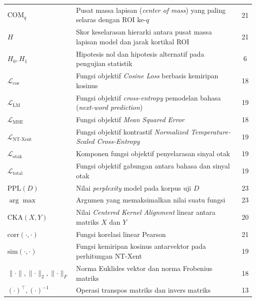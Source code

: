 \begin{longtable}{@{} l >{\raggedright\arraybackslash}p{6.5cm} c @{}}
$\mathrm{COM}_q$ & Pusat massa lapisan (\textit{center of mass}) yang paling selaras dengan ROI ke-$q$ & 21 \\
$H$ & Skor keselarasan hierarki antara pusat massa lapisan model dan jarak kortikal ROI & 21 \\
$H_0, H_1$ & Hipotesis nol dan hipotesis alternatif pada pengujian statistik & 6 \\
$\mathcal{L}_{\text{cos}}$ & Fungsi objektif \textit{Cosine Loss} berbasis kemiripan kosinus & 18 \\
$\mathcal{L}_{\text{LM}}$ & Fungsi objektif \textit{cross-entropy} pemodelan bahasa (\textit{next-word prediction}) & 19 \\
$\mathcal{L}_{\text{MSE}}$ & Fungsi objektif \textit{Mean Squared Error} & 18 \\
$\mathcal{L}_{\text{NT-Xent}}$ & Fungsi objektif kontrastif \textit{Normalized Temperature-Scaled Cross-Entropy} & 19 \\
$\mathcal{L}_{\text{otak}}$ & Komponen fungsi objektif penyelarasan sinyal otak & 19 \\
$\mathcal{L}_{\text{total}}$ & Fungsi objektif gabungan antara bahasa dan sinyal otak & 19 \\
$\text{PPL}(D)$ & Nilai \textit{perplexity} model pada korpus uji $D$ & 23 \\[1ex]

$\arg\max$ & Argumen yang memaksimalkan nilai suatu fungsi & 23 \\
$\mathrm{CKA}(X, Y)$ & Nilai \textit{Centered Kernel Alignment} linear antara matriks $X$ dan $Y$ & 20 \\
$\mathrm{corr}(\cdot, \cdot)$ & Fungsi korelasi linear Pearson & 21 \\
$\mathrm{sim}(\cdot, \cdot)$ & Fungsi kemiripan kosinus antarvektor pada perhitungan NT-Xent & 19 \\
$\lVert \cdot \rVert, \lVert \cdot \rVert_2, \lVert \cdot \rVert_F$ & Norma Euklides vektor dan norma Frobenius matriks & 18 \\
$(\cdot)^\top, (\cdot)^{-1}$ & Operasi transpos matriks dan invers matriks & 13 \\

\end{longtable}
